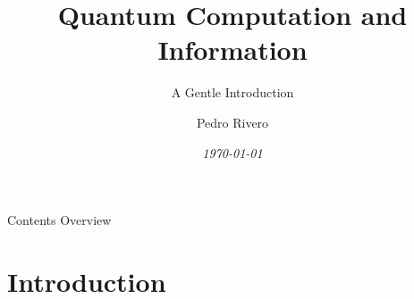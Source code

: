 \documentclass[9pt, handout, aspectratio=169]{beamer}		%
\title{Quantum Computation and Information}
\subtitle{A Gentle Introduction}
\author{Pedro Rivero}
\date{\emph{\small{\today}}}
\institute{Argonne National Laboratory\\ Illinois Institute of Technology\\
\href{mailto:\mail}{\nolinkurl{\mail}}}
\begin{document}
\justify
\setlength{\abovedisplayskip}{0pt}
\setlength{\belowdisplayskip}{12pt}
\setlength{\abovedisplayshortskip}{0pt}
\setlength{\belowdisplayshortskip}{12pt}

	\begin{frame}[plain,t]
		\titlepage
	\end{frame}

	\begin{frame}[c]{Contents Overview}
		\tableofcontents
	\end{frame}


\section{Introduction}
\end{document}
